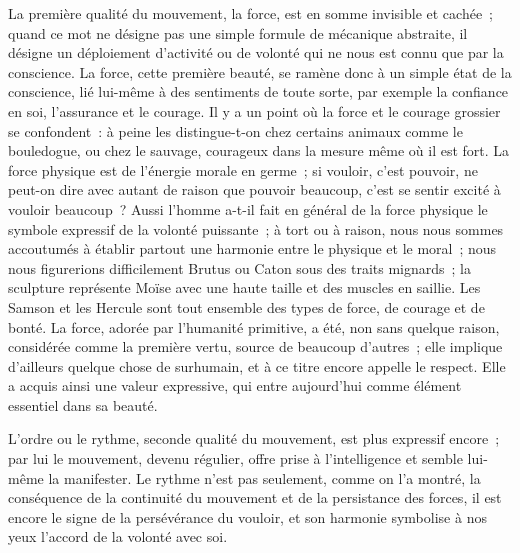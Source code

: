 \documentclass[french,twoside]{book} %
\begin{document}
La première qualité du mouvement, la force, est en somme invisible et cachée ; quand ce mot ne désigne pas une simple formule de mécanique abstraite, il désigne un déploiement d’activité ou de volonté qui ne nous est connu que par la conscience. La force, cette première beauté, se ramène donc à un simple état de la conscience, lié lui-même à des sentiments de toute sorte, par exemple la confiance en soi, l’assurance et le courage. Il y a un point où la force et le courage grossier se confondent : à peine les distingue-t-on chez certains animaux comme le bouledogue, ou chez le sauvage, courageux dans la mesure même où il est fort. La force physique est de l’énergie morale en germe ; si vouloir, c’est pouvoir, ne peut-on dire avec autant de raison que pouvoir beaucoup, c’est se sentir excité à vouloir beaucoup ? Aussi  l’homme a-t-il fait en général de la force physique le symbole expressif de la volonté puissante ; à tort ou à raison, nous nous sommes accoutumés à établir partout une harmonie entre le physique et le moral ; nous nous figurerions difficilement Brutus ou Caton sous des traits mignards ; la sculpture représente Moïse avec une haute taille et des muscles en saillie. Les Samson et les Hercule sont tout ensemble des types de force, de courage et de bonté. La force, adorée par l’humanité primitive, a été, non sans quelque raison, considérée comme la première vertu, source de beaucoup d’autres ; elle implique d’ailleurs quelque chose de surhumain, et à ce titre encore appelle le respect. Elle a acquis ainsi une valeur expressive, qui entre aujourd’hui comme élément essentiel dans sa beauté.\par
L’ordre ou le rythme, seconde qualité du mouvement, est plus expressif encore ; par lui le mouvement, devenu régulier, offre prise à l’intelligence et semble lui-même la manifester. Le rythme n’est pas seulement, comme on l’a montré, la conséquence de la continuité du mouvement et de la persistance des forces, il est encore le signe de la persévérance du vouloir, et son harmonie symbolise à nos yeux l’accord de la volonté avec soi.\par
\end{document}
